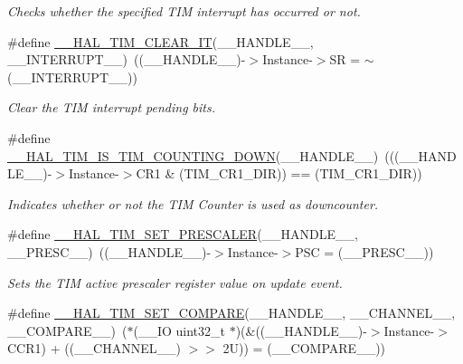\begin{DoxyCompactItemize}
\begin{DoxyCompactList}\small\item\em Checks whether the specified T\+IM interrupt has occurred or not. \end{DoxyCompactList}\item 
\#define \hyperlink{group___t_i_m___exported___macros_gaea68155ce77e591e0c2582def061d6f0}{\+\_\+\+\_\+\+H\+A\+L\+\_\+\+T\+I\+M\+\_\+\+C\+L\+E\+A\+R\+\_\+\+IT}(\+\_\+\+\_\+\+H\+A\+N\+D\+L\+E\+\_\+\+\_\+,  \+\_\+\+\_\+\+I\+N\+T\+E\+R\+R\+U\+P\+T\+\_\+\+\_\+)~((\+\_\+\+\_\+\+H\+A\+N\+D\+L\+E\+\_\+\+\_\+)-\/$>$Instance-\/$>$SR = $\sim$(\+\_\+\+\_\+\+I\+N\+T\+E\+R\+R\+U\+P\+T\+\_\+\+\_\+))
\begin{DoxyCompactList}\small\item\em Clear the T\+IM interrupt pending bits. \end{DoxyCompactList}\item 
\#define \hyperlink{group___t_i_m___exported___macros_gac73f5e7669d92971830481e7298e98ba}{\+\_\+\+\_\+\+H\+A\+L\+\_\+\+T\+I\+M\+\_\+\+I\+S\+\_\+\+T\+I\+M\+\_\+\+C\+O\+U\+N\+T\+I\+N\+G\+\_\+\+D\+O\+WN}(\+\_\+\+\_\+\+H\+A\+N\+D\+L\+E\+\_\+\+\_\+)~(((\+\_\+\+\_\+\+H\+A\+N\+D\+L\+E\+\_\+\+\_\+)-\/$>$Instance-\/$>$C\+R1 \& (T\+I\+M\+\_\+\+C\+R1\+\_\+\+D\+IR)) == (T\+I\+M\+\_\+\+C\+R1\+\_\+\+D\+IR))
\begin{DoxyCompactList}\small\item\em Indicates whether or not the T\+IM Counter is used as downcounter. \end{DoxyCompactList}\item 
\#define \hyperlink{group___t_i_m___exported___macros_gafdc5a06eab07e0c24e729fd492bdb27c}{\+\_\+\+\_\+\+H\+A\+L\+\_\+\+T\+I\+M\+\_\+\+S\+E\+T\+\_\+\+P\+R\+E\+S\+C\+A\+L\+ER}(\+\_\+\+\_\+\+H\+A\+N\+D\+L\+E\+\_\+\+\_\+,  \+\_\+\+\_\+\+P\+R\+E\+S\+C\+\_\+\+\_\+)~((\+\_\+\+\_\+\+H\+A\+N\+D\+L\+E\+\_\+\+\_\+)-\/$>$Instance-\/$>$P\+SC = (\+\_\+\+\_\+\+P\+R\+E\+S\+C\+\_\+\+\_\+))
\begin{DoxyCompactList}\small\item\em Sets the T\+IM active prescaler register value on update event. \end{DoxyCompactList}\item 
\#define \hyperlink{group___t_i_m___exported___macros_ga300d0c9624c3b072d3afeb7cef639b66}{\+\_\+\+\_\+\+H\+A\+L\+\_\+\+T\+I\+M\+\_\+\+S\+E\+T\+\_\+\+C\+O\+M\+P\+A\+RE}(\+\_\+\+\_\+\+H\+A\+N\+D\+L\+E\+\_\+\+\_\+,  \+\_\+\+\_\+\+C\+H\+A\+N\+N\+E\+L\+\_\+\+\_\+,  \+\_\+\+\_\+\+C\+O\+M\+P\+A\+R\+E\+\_\+\+\_\+)~($\ast$(\+\_\+\+\_\+\+IO uint32\+\_\+t $\ast$)(\&((\+\_\+\+\_\+\+H\+A\+N\+D\+L\+E\+\_\+\+\_\+)-\/$>$Instance-\/$>$C\+C\+R1) + ((\+\_\+\+\_\+\+C\+H\+A\+N\+N\+E\+L\+\_\+\+\_\+) $>$$>$ 2\+U)) = (\+\_\+\+\_\+\+C\+O\+M\+P\+A\+R\+E\+\_\+\+\_\+))
$$
\end{DoxyCompactItemize}
